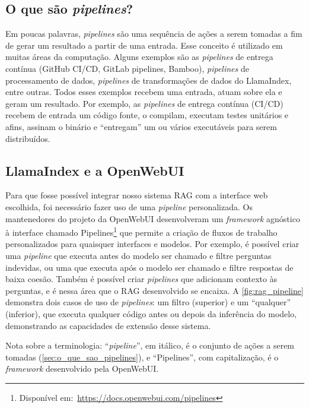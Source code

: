 \documentclass[journal]{IEEEtran}
\begin{document}
\subsection{O que são \textit{pipelines}?\label{sec:o_que_sao_pipelines}}

\noindent%
Em poucas palavras, \textit{pipelines} são uma sequência de ações a serem tomadas a fim de gerar um resultado a partir de uma entrada.
Esse conceito é utilizado em muitas áreas da computação.
Alguns exemplos são as \textit{pipelines} de entrega contínua (GitHub CI/CD, GitLab pipelines, Bamboo), \textit{pipelines} de processamento de dados, \textit{pipelines} de transformações de dados do LlamaIndex, entre outras.
Todos esses exemplos recebem uma entrada, atuam sobre ela e geram um resultado.
Por exemplo, as \textit{pipelines} de entrega contínua (CI/CD) recebem de entrada um código fonte, o compilam, executam testes unitários e afins, assinam o binário e ``entregam'' um ou vários executáveis para serem distribuídos.

\subsection{LlamaIndex e a OpenWebUI}

\noindent%
Para que fosse possível integrar nosso sistema RAG com a interface web escolhida, foi necessário fazer uso de uma \textit{pipeline} personalizada.
Os mantenedores do projeto da OpenWebUI desenvolveram um \textit{framework} agnóstico à interface chamado Pipelines\footnote{Disponível em:~\url{https://docs.openwebui.com/pipelines}} que permite a criação de fluxos de trabalho personalizados para quaisquer interfaces e modelos.
Por exemplo, é possível criar uma \textit{pipeline} que executa antes do modelo ser chamado e filtre perguntas indevidas, ou uma que executa após o modelo ser chamado e filtre respostas de baixa coesão.
Também é possível criar \textit{pipelines} que adicionam contexto às perguntas, e é nessa área que o RAG desenvolvido se encaixa.
A \cref{fig:rag_pipeline} demonstra dois casos de uso de \textit{pipelines}: um filtro (superior) e um ``qualquer'' (inferior), que executa qualquer código antes ou depois da inferência do modelo, demonstrando as capacidades de extensão desse sistema.

Nota sobre a terminologia: ``\textit{pipeline}'', em itálico, é o conjunto de ações a serem tomadas (\autoref{sec:o_que_sao_pipelines}), e ``Pipelines'', com capitalização, é o \textit{framework} desenvolvido pela OpenWebUI\@.
\end{document}
